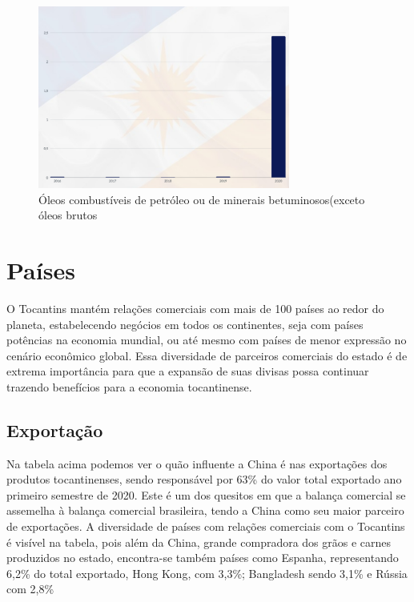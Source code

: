 \begin{figure} [h] \caption{Óleos combustíveis de petróleo ou de minerais betuminosos(exceto óleos brutos}
	\includegraphics[width=\linewidth]{fig/inst1.png}
\end{figure}

\newpage 

\section{Países}
\par O Tocantins mantém relações comerciais com mais de 100 países ao redor do planeta, estabelecendo negócios em todos os continentes, seja com países potências na economia mundial, ou até mesmo com países de menor expressão no cenário econômico global. Essa diversidade de parceiros comerciais do estado é de extrema importância para que a expansão de suas divisas possa continuar trazendo benefícios para a economia tocantinense.

\vspace{0.5cm}
\subsection {Exportação}
\par Na tabela acima podemos ver o quão influente a China é nas exportações dos produtos tocantinenses, sendo responsável por 63\% do valor total exportado ano primeiro semestre de 2020. Este é um dos quesitos em que a balança comercial se assemelha à balança comercial brasileira, tendo a China como seu maior parceiro de exportações. 
A diversidade de países com relações comerciais com o Tocantins é visível na tabela, pois além da China, grande compradora dos grãos e carnes produzidos no estado, encontra-se também países como Espanha, representando 6,2\% do total exportado, Hong Kong, com 3,3\%; Bangladesh sendo 3,1\% e Rússia com 2,8\%

